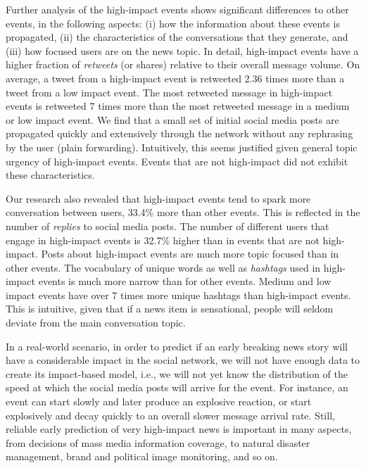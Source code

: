 \documentclass[10pt,letterpaper]{article}
\begin{document}
Further analysis of the high-impact events shows significant
differences to other events, in the following aspects: (i) how the
information about these events is propagated, (ii) the characteristics
of the conversations that they generate, and (iii) how focused users
are on the news topic. In detail, high-impact events have a higher
fraction of {\em retweets} (or shares) relative to their overall
message volume. On average, a tweet from a high-impact event is
retweeted 2.36 times more than a tweet from a low impact event. The
most retweeted message in high-impact events is retweeted 7 times more
than the most retweeted message in a medium or low impact event. We
find that a small set of initial social media posts are propagated
quickly and extensively through the network without any rephrasing by
the user (plain forwarding). Intuitively, this seems justified given
general topic urgency of high-impact events. Events that are not
high-impact did not exhibit these characteristics.

Our research also revealed that high-impact events tend to spark more conversation
between users, 33.4\% more than other events. This is reflected in the
number of {\em replies} to social media posts. The number of different
users that engage in high-impact events is 32.7\% higher than in
events that are not high-impact. Posts about high-impact events are
much more topic focused than in other events. The vocabulary of unique
words as well as {\em hashtags} used in high-impact events is much
more narrow than for other events. Medium and low impact events have
over 7 times more unique hashtags than high-impact events. This is
intuitive, given that if a news item is sensational, people will
seldom deviate from the main conversation topic.


In a real-world scenario, in order to predict if an early breaking
news story will have a considerable impact in the social network, we
will not have enough data to create its impact-based model, i.e., we
will not yet know the distribution of the speed at which the social
media posts will arrive for the event. For instance, an event can
start slowly and later produce an explosive reaction, or start
explosively and decay quickly to an overall slower message arrival
rate. Still, reliable early prediction of very high-impact news is
important in many aspects, from decisions of mass media information
coverage, to natural disaster management, brand and political image
monitoring, and so on.
\end{document}
